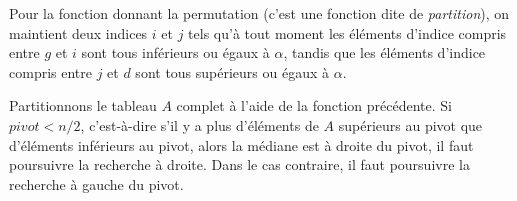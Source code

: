 \Q
Pour la fonction donnant la permutation (c'est une fonction dite de \textit{partition}), on maintient deux indices $i$ et $j$ tels qu'à tout moment les éléments d'indice compris entre $g$ et $i$ sont tous inférieurs ou égaux à $\alpha$, tandis que les éléments d'indice compris entre $j$ et $d$ sont tous supérieurs ou égaux à $\alpha$.



\newpage

\Q
Partitionnons le tableau $A$ complet à l'aide de la fonction précédente. Si $\textit{pivot}<n/2$, c'est-à-dire s'il y a plus d'éléments de $A$ supérieurs au pivot que d'éléments inférieurs au pivot, alors la médiane est à droite du pivot, il faut poursuivre la recherche à droite. Dans le cas contraire, il faut poursuivre la recherche à gauche du pivot.



\Fin
